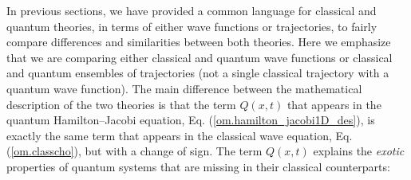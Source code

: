 \documentclass[onecolumn,nofootinbib, secnumarabic, amsmath, nobibnotes,12pt,aps,pra]{revtex4-1}
\newcommand{\eref}[1]{Eq. (\ref{#1})}
\begin{document}
In previous sections, we have provided a common language for
classical and quantum theories, in terms of either wave functions or
trajectories, to fairly compare differences and similarities between
both theories. Here we emphasize that we are comparing either
classical and quantum wave functions or classical and quantum
ensembles of trajectories (not a single classical trajectory with a
quantum wave function). The main difference between the mathematical
description of the two theories is that the term \textit{$Q(x,t)$}
that appears in the quantum Hamilton--Jacobi equation,
\eref{om.hamilton_jacobi1D_des}, is exactly the same term that
appears in the classical wave equation, \eref{om.classcho}, but with a
change of sign. The term \textit{$Q(x,t)$} explains the
\textit{exotic} properties of quantum systems that are missing in
their classical counterparts:
\end{document}
